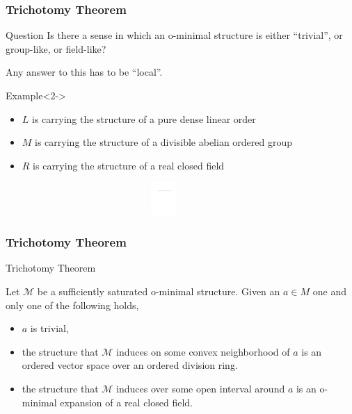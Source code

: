 \begin{frame}[t]\frametitle{Trichotomy Theorem}
    
	\begin{beamerboxesrounded}[shadow=true, upper=question]{Question}
		Is there a sense in which an o-minimal structure is either ``trivial'', or group-like, or field-like?
	\end{beamerboxesrounded}

	Any answer to this has to be ``local''.

	\begin{exampleblock}{Example}<2->

		\begin{itemize}
			\item $L$ is carrying the structure of a  pure dense linear order
			\item $M$ is carrying the structure of a  divisible abelian ordered group
			\item $R$ is carrying the structure of a  real closed field
		\end{itemize}

		\centering\includegraphics[height=1.25cm,width=12cm]{img/trichotomy--.pdf}\par

	\end{exampleblock}

\end{frame}

\begin{frame}[c]\frametitle{Trichotomy Theorem}
    
	\begin{beamerboxesrounded}[shadow=true]{Trichotomy Theorem}
		
		Let $\mathcal{M}$ be a sufficiently saturated o-minimal structure.
		Given an $a \in M$ one and only one of the following holds,

		\begin{itemize}
			\item $a$ is trivial,
			\item the structure that $\mathcal{M}$ induces on some convex neighborhood of $a$ is an ordered vector space over an ordered division ring.
			\item the structure that $\mathcal{M}$ induces over some open interval around $a$ is an o-minimal expansion of a real closed field.
		\end{itemize}

	\end{beamerboxesrounded}

\end{frame}